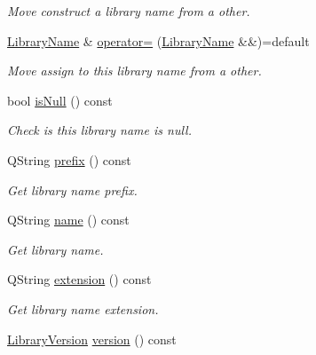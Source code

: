 \begin{DoxyCompactItemize}
\begin{DoxyCompactList}\small\item\em Move construct a library name from a other. \end{DoxyCompactList}\item 
\hyperlink{class_mdt_1_1_deploy_utils_1_1_library_name}{Library\+Name} \& \hyperlink{class_mdt_1_1_deploy_utils_1_1_library_name_af83d44949b9e29a45283b4fcf9c181a2}{operator=} (\hyperlink{class_mdt_1_1_deploy_utils_1_1_library_name}{Library\+Name} \&\&)=default\hypertarget{class_mdt_1_1_deploy_utils_1_1_library_name_af83d44949b9e29a45283b4fcf9c181a2}{}\label{class_mdt_1_1_deploy_utils_1_1_library_name_af83d44949b9e29a45283b4fcf9c181a2}

\begin{DoxyCompactList}\small\item\em Move assign to this library name from a other. \end{DoxyCompactList}\item 
bool \hyperlink{class_mdt_1_1_deploy_utils_1_1_library_name_ab833694184a4cf330ddf77095ea6bb9f}{is\+Null} () const \hypertarget{class_mdt_1_1_deploy_utils_1_1_library_name_ab833694184a4cf330ddf77095ea6bb9f}{}\label{class_mdt_1_1_deploy_utils_1_1_library_name_ab833694184a4cf330ddf77095ea6bb9f}

\begin{DoxyCompactList}\small\item\em Check is this library name is null. \end{DoxyCompactList}\item 
Q\+String \hyperlink{class_mdt_1_1_deploy_utils_1_1_library_name_a97bcd2eb9df2f836ade7db5b1812e808}{prefix} () const 
\begin{DoxyCompactList}\small\item\em Get library name prefix. \end{DoxyCompactList}\item 
Q\+String \hyperlink{class_mdt_1_1_deploy_utils_1_1_library_name_a4b379ec428e7819d9f164f25a472b6b1}{name} () const 
\begin{DoxyCompactList}\small\item\em Get library name. \end{DoxyCompactList}\item 
Q\+String \hyperlink{class_mdt_1_1_deploy_utils_1_1_library_name_a34442b11c8cd11ceb8f6903d473dcd2d}{extension} () const 
\begin{DoxyCompactList}\small\item\em Get library name extension. \end{DoxyCompactList}\item 
\hyperlink{class_mdt_1_1_deploy_utils_1_1_library_version}{Library\+Version} \hyperlink{class_mdt_1_1_deploy_utils_1_1_library_name_a59e3df9a9af9a081a9b09eec7292bb80}{version} () const \hypertarget{class_mdt_1_1_deploy_utils_1_1_library_name_a59e3df9a9af9a081a9b09eec7292bb80}{}\label{class_mdt_1_1_deploy_utils_1_1_library_name_a59e3df9a9af9a081a9b09eec7292bb80}


\end{DoxyCompactItemize}
